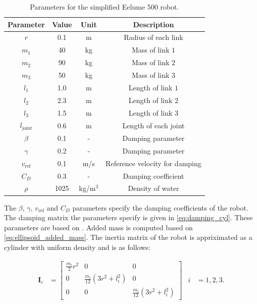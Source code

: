 \begin{table}[h]
    \centering
    \begin{tabular}{|c|c|c|c|}
        \hline
        Parameter & Value & Unit & Description \\ \hline
        $r$ & 0.1 & m & Radius of each link \\
        $m_1$ & 40 & kg & Mass of link $1$ \\
        $m_2$ & 90 & kg & Mass of link $2$ \\
        $m_3$ & 50 & kg & Mass of link $3$ \\
        $l_1$ & 1.0 & m & Length of link $1$ \\
        $l_2$ & 2.3 & m & Length of link $2$ \\
        $l_3$ & 1.5 & m & Length of link $3$ \\
        $l_{\mathrm{joint}}$ & 0.6 & m & Length of each joint \\
        $\beta$ & 0.1 & - & Damping parameter \\
        $\gamma$ & 0.2 & - & Damping parameter \\
        $v_{\mathrm{ref}}$ & 0.1 & m/s & Reference velocity for damping \\
        $C_D$ & 0.3 & - & Damping coefficient \\
        $\rho$ & 1025 & kg/m$^3$ & Density of water \\
        \hline
    \end{tabular}
    \caption{Parameters for the simplified Eelume 500 robot.}
    \label{tab:robot}
\end{table}

The $\beta$, $\gamma$, $v_{\mathrm{ref}}$ and $C_D$ parameters specify the damping
coefficients of the robot. The damping matrix the parameters specify is given in
\autoref{eq:damping_cyl}. These parameters are based on \cite{bendik}. Added mass
is computed based on \autoref{eq:ellipsoid_added_mass}.
The inertia matrix of the robot is appriximated as a
cylinder with uniform density and is as follows:

\begin{align}
    \bm{I}_i &=
    \begin{bmatrix}
        \frac{m_i}{2} r^2 & 0 & 0 \\
        0 & \frac{m_i}{12} (3r^2 + l_i^2) & 0 \\
        0 & 0 & \frac{m_i}{12} (3r^2 + l_i^2)
    \end{bmatrix} &
    i &= 1, 2, 3.
\end{align}

